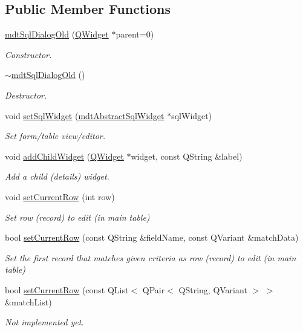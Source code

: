 \subsection*{Public Member Functions}
\begin{DoxyCompactItemize}
\item 
\hyperlink{classmdt_sql_dialog_old_a09d803b8fdeda106f5e09c74cd083777}{mdt\-Sql\-Dialog\-Old} (\hyperlink{class_q_widget}{Q\-Widget} $\ast$parent=0)
\begin{DoxyCompactList}\small\item\em Constructor. \end{DoxyCompactList}\item 
\hyperlink{classmdt_sql_dialog_old_ad94d87750cbe3f4b8d90ad486e0ae2dd}{$\sim$mdt\-Sql\-Dialog\-Old} ()
\begin{DoxyCompactList}\small\item\em Destructor. \end{DoxyCompactList}\item 
void \hyperlink{classmdt_sql_dialog_old_ab164a92148ee8c41687f8ec461199924}{set\-Sql\-Widget} (\hyperlink{classmdt_abstract_sql_widget}{mdt\-Abstract\-Sql\-Widget} $\ast$sql\-Widget)
\begin{DoxyCompactList}\small\item\em Set form/table view/editor. \end{DoxyCompactList}\item 
void \hyperlink{classmdt_sql_dialog_old_a009ae8ce4b25cd143fd19b0d680c2aa1}{add\-Child\-Widget} (\hyperlink{class_q_widget}{Q\-Widget} $\ast$widget, const Q\-String \&label)
\begin{DoxyCompactList}\small\item\em Add a child (details) widget. \end{DoxyCompactList}\item 
void \hyperlink{classmdt_sql_dialog_old_aa632b9e478abfd39fb619017ad858588}{set\-Current\-Row} (int row)
\begin{DoxyCompactList}\small\item\em Set row (record) to edit (in main table) \end{DoxyCompactList}\item 
bool \hyperlink{classmdt_sql_dialog_old_a8a037786d182ce5c521a09f98c32cbeb}{set\-Current\-Row} (const Q\-String \&field\-Name, const Q\-Variant \&match\-Data)
\begin{DoxyCompactList}\small\item\em Set the first record that matches given criteria as row (record) to edit (in main table) \end{DoxyCompactList}\item 
bool \hyperlink{classmdt_sql_dialog_old_a658d4a0a9bc97cb8a354a5b2157ab1a0}{set\-Current\-Row} (const Q\-List$<$ Q\-Pair$<$ Q\-String, Q\-Variant $>$ $>$ \&match\-List)
\begin{DoxyCompactList}\small\item\em Not implemented yet. \end{DoxyCompactList}\end{DoxyCompactItemize}



